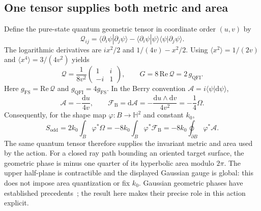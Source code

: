 \documentclass[11pt]{article}
\newcommand{\dd}{\mathrm d}
\begin{document}
\subsection{One tensor supplies both metric and area}
Define the pure-state quantum geometric tensor in coordinate order $(u,v)$ by
\[
\mathcal Q_{ij}=\langle\partial_i\psi|\partial_j\psi\rangle
-\langle\partial_i\psi|\psi\rangle\langle\psi|\partial_j\psi\rangle.
\]
The logarithmic derivatives are $ix^2/2$ and $1/(4v)-x^2/2$. Using $\langle x^2\rangle=1/(2v)$ and $\langle x^4\rangle=3/(4v^2)$ yields
\begin{equation}\label{eq:QGT}
\boxed{\mathcal Q=\frac1{8v^2}\begin{pmatrix}1&i\\-i&1\end{pmatrix},
\qquad G=8\,\mathrm{Re}\,\mathcal Q=2\,g_{\mathrm{QFI}}.}
\end{equation}
Here $g_{\mathrm{FS}}=\mathrm{Re}\,\mathcal Q$ and $g_{\mathrm{QFI}}=4g_{\mathrm{FS}}$. In the Berry convention $\mathcal A=i\langle\psi|\dd\psi\rangle$,
\begin{equation}\label{eq:berry}
\boxed{\mathcal A=-\frac{\dd u}{4v},\qquad
\mathcal F_{\mathrm B}=\dd\mathcal A=-\frac{\dd u\wedge\dd v}{4v^2}=-\frac14\Omega.}
\end{equation}
Consequently, for the shape map $\varphi:B\to\mathbb H^2$ and constant $k_0$,
\begin{equation}\label{eq:oddBerry}
S_{\mathrm{odd}}=2k_0\int_B\varphi^*\Omega
=-8k_0\int_B\varphi^*\mathcal F_{\mathrm B}
=-8k_0\oint_{\partial B}\varphi^*\mathcal A.
\end{equation}
The same quantum tensor therefore supplies the invariant metric and area used by the action. For a closed ray path bounding an oriented target surface, the geometric phase is minus one quarter of its hyperbolic area modulo $2\pi$. The upper half-plane is contractible and the displayed Gaussian gauge is global: this does not impose area quantization or fix $k_0$. Gaussian geometric phases have established precedents~\cite{Garcia,Seshadri}; the result here makes their precise role in this action explicit.
\end{document}
